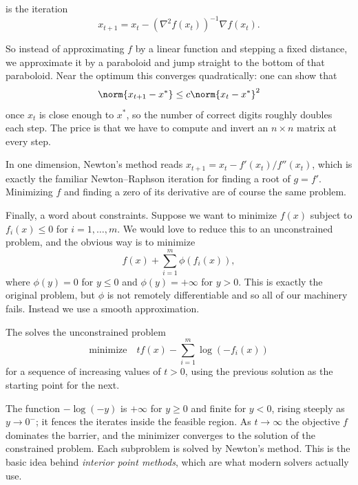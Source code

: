 \documentclass[a4paper]{scrartcl}
\begin{document}
\begin{definition}
     is the iteration
    $$
    x_{t + 1} = x_t - \left(\nabla^2 f(x_t)\right)^{-1}\nabla f(x_t).
    $$
\end{definition}

So instead of approximating $f$ by a linear function and stepping a fixed distance, we approximate it by a paraboloid and jump straight to the bottom of that paraboloid. Near the optimum this converges quadratically: one can show that
$$
\norm{x_{t+1} - x^*} \leq c\norm{x_t - x^*}^2
$$
once $x_t$ is close enough to $x^*$, so the number of correct digits roughly doubles each step. The price is that we have to compute and invert an $n \times n$ matrix at every step.

\begin{remark}
    In one dimension, Newton's method reads $x_{t+1} = x_t - f'(x_t)/f''(x_t)$, which is exactly the familiar Newton--Raphson iteration for finding a root of $g = f'$. Minimizing $f$ and finding a zero of its derivative are of course the same problem.
\end{remark}

Finally, a word about constraints. Suppose we want to minimize $f(x)$ subject to $f_i(x) \leq 0$ for $i = 1, \dots, m$. We would love to reduce this to an unconstrained problem, and the obvious way is to minimize
$$
f(x) + \sum_{i = 1}^m \phi(f_i(x)),
$$
where $\phi(y) = 0$ for $y \leq 0$ and $\phi(y) = +\infty$ for $y > 0$. This is exactly the original problem, but $\phi$ is not remotely differentiable and so all of our machinery fails. Instead we use a smooth approximation.

\begin{definition}
    The  solves the unconstrained problem
    $$
    \text{minimize} \quad tf(x) - \sum_{i = 1}^m \log(-f_i(x))
    $$
    for a sequence of increasing values of $t > 0$, using the previous solution as the starting point for the next.
\end{definition}

The function $-\log(-y)$ is $+\infty$ for $y \geq 0$ and finite for $y < 0$, rising steeply as $y \rightarrow 0^-$; it fences the iterates inside the feasible region. As $t \rightarrow \infty$ the objective $f$ dominates the barrier, and the minimizer converges to the solution of the constrained problem. Each subproblem is solved by Newton's method. This is the basic idea behind \emph{interior point methods}, which are what modern solvers actually use.
\end{document}
